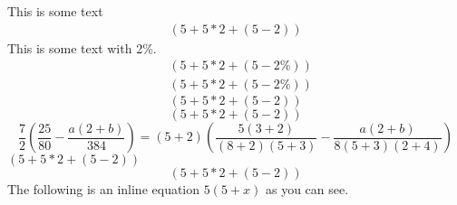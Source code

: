 \documentclass[12pt,a4paper]{article}
\begin{document}
	This is some text
	\begin{align}\label{equ1(good)}%
	(5+5*2+(5-2))%
	\end{align}
	This is some text with 2\%.
	\begin{align*}
	&(5+5*2+(5-2\%))\\
	&\left(5+5*2+\left(5-2\%\right)\right)%
	\end{align*}
	\begin{equation}\label{equ2(good)}
	(5+5*2+(5-2))%
	\end{equation}
	\begin{equation*}
	(5+5*2+(5-2))
	\end{equation*}
	\begin{equation*}
	\frac{7}{2}(\frac{25}{80}-\frac{a(2+b)}{384}) = (5+2)(\frac{5(3+2)}{(8+2)(5+3)}-\frac{a(2+b)}{8(5+3)(2+4)})
	\end{equation*}
	\((5+5*2+(5-2))\)
	\[(5+5*2+(5-2))\]
	The following is an inline equation $5(5+x)$ as you can see.
\end{document}
